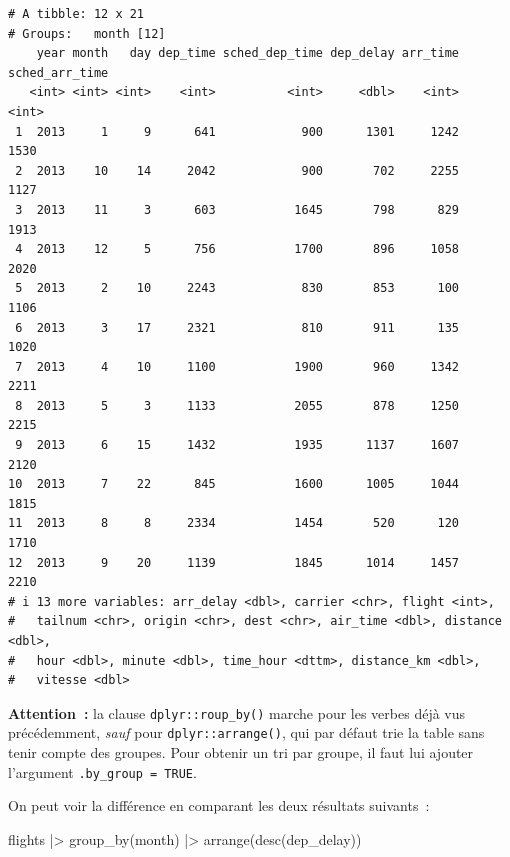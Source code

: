 \documentclass[
  letterpaper,
  DIV=11,
  numbers=noendperiod,
  oneside]{scrreprt}
\newenvironment{Shaded}{\begin{snugshade}}{\end{snugshade}}
\newcommand{\FunctionTok}[1]{\textcolor[rgb]{0.28,0.35,0.67}{#1}}
\newcommand{\NormalTok}[1]{\textcolor[rgb]{0.00,0.23,0.31}{#1}}
\newcommand{\SpecialCharTok}[1]{\textcolor[rgb]{0.37,0.37,0.37}{#1}}
\begin{document}
\begin{verbatim}
# A tibble: 12 x 21
# Groups:   month [12]
    year month   day dep_time sched_dep_time dep_delay arr_time sched_arr_time
   <int> <int> <int>    <int>          <int>     <dbl>    <int>          <int>
 1  2013     1     9      641            900      1301     1242           1530
 2  2013    10    14     2042            900       702     2255           1127
 3  2013    11     3      603           1645       798      829           1913
 4  2013    12     5      756           1700       896     1058           2020
 5  2013     2    10     2243            830       853      100           1106
 6  2013     3    17     2321            810       911      135           1020
 7  2013     4    10     1100           1900       960     1342           2211
 8  2013     5     3     1133           2055       878     1250           2215
 9  2013     6    15     1432           1935      1137     1607           2120
10  2013     7    22      845           1600      1005     1044           1815
11  2013     8     8     2334           1454       520      120           1710
12  2013     9    20     1139           1845      1014     1457           2210
# i 13 more variables: arr_delay <dbl>, carrier <chr>, flight <int>,
#   tailnum <chr>, origin <chr>, dest <chr>, air_time <dbl>, distance <dbl>,
#   hour <dbl>, minute <dbl>, time_hour <dttm>, distance_km <dbl>,
#   vitesse <dbl>
\end{verbatim}

\textbf{Attention~:} la clause \texttt{dplyr::roup\_by()} marche pour
les verbes déjà vus précédemment, \emph{sauf} pour
\texttt{dplyr::arrange()}, qui par défaut trie la table sans tenir
compte des groupes. Pour obtenir un tri par groupe, il faut lui ajouter
l'argument \texttt{.by\_group\ =\ TRUE}.

On peut voir la différence en comparant les deux résultats suivants~:

\begin{Shaded}
\begin{Highlighting}[]
\NormalTok{flights }\SpecialCharTok{|\textgreater{}} 
  \FunctionTok{group\_by}\NormalTok{(month) }\SpecialCharTok{|\textgreater{}} 
  \FunctionTok{arrange}\NormalTok{(}\FunctionTok{desc}\NormalTok{(dep\_delay))}
\end{Highlighting}
\end{Shaded}
\end{document}
